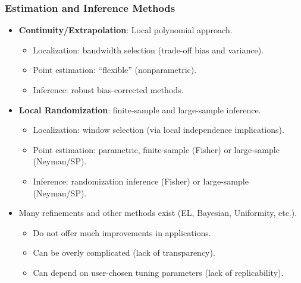 \documentclass[9pt]{beamer}
\begin{document}
\begin{frame}\frametitle{Estimation and Inference Methods}
	\begin{itemize}
		\item \textbf{Continuity/Extrapolation}: Local polynomial approach.\medskip
		\begin{itemize}
			\item Localization: bandwidth selection (trade-off bias and variance).\medskip
			\item Point estimation: ``flexible'' (nonparametric).\medskip
			\item Inference: robust bias-corrected methods.\bigskip
		\end{itemize}
		
		\item \textbf{Local Randomization}: finite-sample and large-sample inference.\medskip
		\begin{itemize}
			\item Localization: window selection (via local independence implications).\medskip
			\item Point estimation: parametric, finite-sample (Fisher) or large-sample (Neyman/SP).\medskip
			\item Inference: randomization inference (Fisher) or large-sample (Neyman/SP).\bigskip
		\end{itemize}
		
		\item Many refinements and other methods exist (EL, Bayesian, Uniformity, etc.).\medskip
		\begin{itemize}
			\item Do not offer much improvements in applications.\medskip
			\item Can be overly complicated (lack of transparency).\medskip
			\item Can depend on user-chosen tuning parameters (lack of replicability).\bigskip
		\end{itemize}
		
	\end{itemize}
\end{frame}
\end{document}
